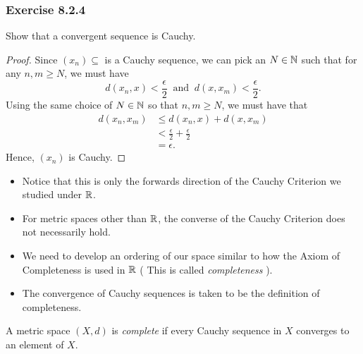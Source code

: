 \subsubsection{Exercise 8.2.4} Show that a convergent sequence is Cauchy.
\begin{proof}
    Since \( (x_{n}) \subseteq \) is a Cauchy sequence, we can pick an \( N \in \mathbb{N}  \) such that for any \( n,m \geq N  \), we must have 
    \[  d(x_{n}, x ) < \frac{ \epsilon  }{ 2  }  \ \text{ and } \ d(x, x_{m}) < \frac{ \epsilon  }{ 2 } .\] Using the same choice of \( N \in \mathbb{N}  \) so that \( n,m \geq N  \), we must have that
    \begin{align*}
        d(x_{n}, x_{m}) &\leq d(x_{n}, x )  + d(x, x_{m})\\ 
                        &< \frac{ \epsilon  }{ 2 }  + \frac{ \epsilon  }{ 2 }  \\
                        &= \epsilon.
    \end{align*}
    Hence, \( (x_{n}) \) is Cauchy.
\end{proof}

\begin{itemize}
    \item Notice that this is only the forwards direction of the Cauchy Criterion we studied under \( \mathbb{R}  \). 
    \item For metric spaces other than \( \mathbb{R}  \), the converse of the Cauchy Criterion does not necessarily hold.
    \item We need to develop an ordering of our space similar to how the Axiom of Completeness is used in \( \mathbb{R}  \) ( This is called \textit{completeness}  ). 
    \item The convergence of Cauchy sequences is taken to be the definition of completeness.
\end{itemize}


\begin{definition}
A metric space \( (X, d ) \) is \textit{complete} if every Cauchy sequence in \( X  \) converges to an element of \( X  \).
\end{definition}


